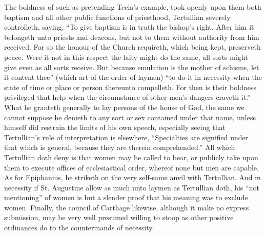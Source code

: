 The boldness of such as pretending Tecla’s example, took openly upon them both baptism and all other public functions of priesthood, Tertullian severely controlleth, saying, “To give baptism is in truth the bishop’s right. After him it belongeth unto priests and deacons, but not to them without authority from him received. For so the honour of the Church requireth, which being kept, preserveth peace. Were it not in this respect the laity might do the same, all sorts might give even as all sorts receive. But because emulation is the mother of schisms, let it content thee” (which  art of the order of laymen) “to do it in necessity when the state of time or place or person thereunto compelleth. For then is their boldness privileged that help when the circumstance of other men’s dangers craveth it.” What he granteth generally to lay persons of the house of God, the same we cannot suppose he denieth to any sort or sex contained under that name, unless himself did restrain the limits of his own speech, especially seeing that Tertullian’s rule of interpretation is elsewhere, “Specialties are signified under that which is general, because they are therein comprehended.” All which Tertullian doth deny is that women may be called to bear, or publicly take upon them to execute offices of ecclesiastical order, whereof none but men are capable.
As for Epiphanius, he striketh on the very self-same anvil with Tertullian.
And in necessity if St. Augustine allow as much unto laymen as Tertullian doth, his “not mentioning” of women is but a slender proof that his meaning was to exclude women.
Finally, the council of Carthage likewise, although it  make no express submission, may be very well presumed willing to stoop as other positive ordinances do to the countermands of necessity.
